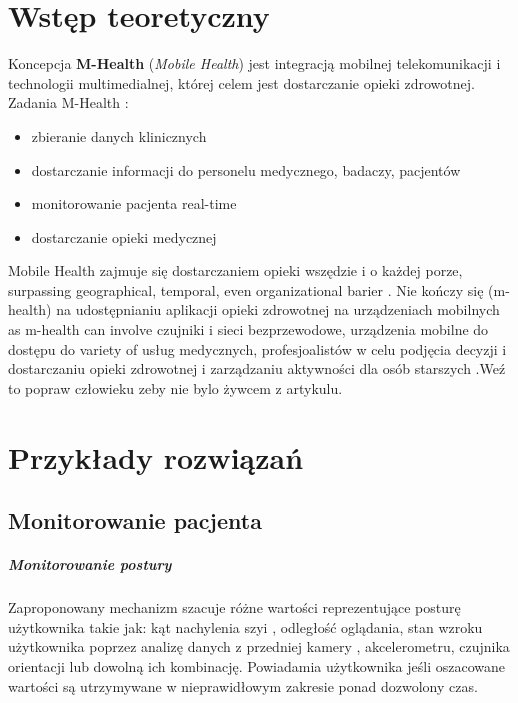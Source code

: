 \chapter{Wstęp teoretyczny}
Koncepcja \textbf{M-Health} (\emph{Mobile Health}) jest integracją mobilnej telekomunikacji i technologii multimedialnej, której celem jest dostarczanie opieki zdrowotnej.\\
Zadania M-Health \cite{5969916} :
\begin{itemize}
\item zbieranie danych klinicznych
\item dostarczanie informacji do personelu medycznego, badaczy, pacjentów
\item monitorowanie pacjenta real-time
\item dostarczanie opieki medycznej
\end{itemize}
Mobile Health zajmuje się dostarczaniem opieki wszędzie i o każdej porze, surpassing geographical, temporal, even organizational barier \cite{6655256}. Nie kończy się (m-health) na udostępnianiu aplikacji opieki zdrowotnej na urządzeniach mobilnych as m-health can involve czujniki i sieci bezprzewodowe, urządzenia mobilne do dostępu do variety of usług medycznych, profesjoalistów w celu podjęcia decyzji i dostarczaniu opieki zdrowotnej i zarządzaniu aktywności dla osób starszych \cite{Varshney2014}.Weź to popraw człowieku zeby nie bylo żywcem z artykulu.

\chapter{Przykłady rozwiązań}
\section{Monitorowanie pacjenta}
\paragraph{Monitorowanie postury \cite{Lee:2012:MPM:2370216.2370320}\\}
Zaproponowany mechanizm szacuje różne wartości reprezentujące posturę użytkownika takie jak: kąt nachylenia szyi , odległość oglądania, stan wzroku użytkownika poprzez analizę danych z przedniej kamery , akcelerometru, czujnika orientacji lub dowolną ich kombinację. Powiadamia użytkownika jeśli oszacowane
wartości są utrzymywane w nieprawidłowym zakresie ponad dozwolony czas.
